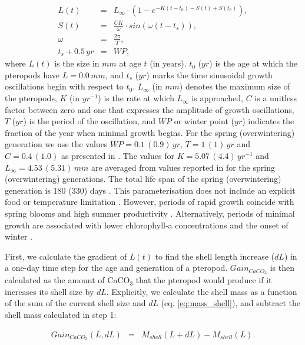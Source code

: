 {\scriptsize
\begin{eqnarray}
L(t) & = & L_{\infty} \cdot (1 - e^{-K(t-t_0) - S(t) + S(t_0)}),  \label{eq:shell_size}\\
S(t) & = & \frac{CK}{\omega} \cdot sin(\omega (t-t_s)), \\
\omega & = & \frac{2\pi}{T}, \\
t_s + 0.5\, yr & = & WP,
\end{eqnarray}}
\noindent
where $L(t)$ is the size in $mm$ at age $t$ (in years). $t_0$ ($yr$) is the age at which the pteropods have $L=0.0\, mm$, and $t_s$ ($yr$) marks the time sinusoidal growth oscillations begin with respect to $t_0$. $L_{\infty}$ (in $mm$) denotes the maximum size of the pteropods, $K$ (in $yr^{-1}$) is the rate at which $L_{\infty}$ is approached, $C$ is a unitless factor between zero and one that expresses the amplitude of growth oscillations, $T$ ($yr$) is the period of the oscillation, and $WP$ or winter point ($yr$) indicates the fraction of the year when minimal growth begins. For the spring (overwintering) generation we use the values $WP=0.1\, (0.9)\, yr$, $T=1\, (1)\, yr$ and $C=0.4\,(1.0)$ as presented in \citet{Wang2017Lifecycle}. The values for $K=5.07\, (4.4)\,yr^{-1}$ and $L_{\infty} = 4.53\,(5.31)\, mm$ are averaged from values reported in \cite{Wang2017Lifecycle} for the spring (overwintering) generations. The total life span of the spring (overwintering) generation is 180 (330) days \citep{Wang2017Lifecycle}. This parameterisation does not include an explicit food or temperature limitation \citep{Wang2017Lifecycle}. However, periods of rapid growth coincide with spring blooms and high summer productivity \citep{Wang2017Lifecycle,Maas2020Lipids}. Alternatively, periods of minimal growth are associated with lower chlorophyll-a concentrations and the onset of winter \citep{Wang2017Lifecycle,Maas2020Lipids}.

First, we calculate the gradient of $L(t)$ to find the shell length increase ($dL$) in a one-day time step for the age and generation of a pteropod. $Gain_{CaCO_3}$ is then calculated as the amount of CaCO$_3$ that the pteropod would produce if it increases its shell size by $dL$. Explicitly, we calculate the shell mass as a function of the sum of the current shell size and $dL$ (eq. \ref{eq:mass_shell}), and subtract the shell mass calculated in step 1:

{\scriptsize
\begin{eqnarray}
Gain_{CaCO_3}(L,dL) & = & M_{shell}(L+dL) - M_{shell}(L).
\end{eqnarray}}

